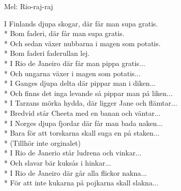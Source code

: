 \begin{SongText}
    \begin{SongInfo}
        Mel: Rio-raj-raj
    \end{SongInfo}
    \begin{SongVerse}
        I Finlands djupa skogar, där får man supa gratis.\\*%
        Bom faderi, där får man supa gratis.\\*%
        Och sedan växer nubbarna i magen som potatis.\\*%
        Bom faderi faderullan lej.\\*%
        I Rio de Janeiro där får man pippa gratis...\\*%
        Och ungarna växer i magen som potatis...\\*%
        I Ganges djupa delta där pippar man i diken...\\*%
        Och finns det inga levande så pippar man på liken...\\*%
        I Tarzans mörka hydda, där ligger Jane och flämtar...\\*%
        Bredvid står Cheeta med en banan och väntar...\\*%
        I Norges djupa fjordar där får man bada naken...\\*%
        Bara för att torskarna skall suga en på staken...\\*%
        (Tillhör inte orginalet)\\*%
        I Rio de Janerio står ludrena och vinkar...\\*%
        Och slavar bär kuksås i hinkar...\\*%
        I Rio de Janeiro där går alla flickor nakna...\\*%
        För att inte kukarna på pojkarna skall slakna...
    \end{SongVerse}
\end{SongText}
